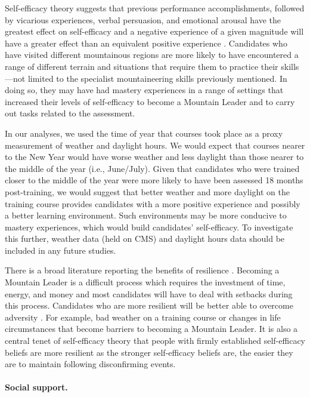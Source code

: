 \documentclass[
  12pt,
  a4paper,
]{book}
\begin{document}
Self-efficacy theory suggests that previous performance accomplishments, followed by vicarious experiences, verbal persuasion, and emotional arousal have the greatest effect on self-efficacy and a negative experience of a given magnitude will have a greater effect than an equivalent positive experience \citep{Bandura1977, Bandura1982}. Candidates who have visited different mountainous regions are more likely to have encountered a range of different terrain and situations that require them to practice their skills---not limited to the specialist mountaineering skills previously mentioned. In doing so, they may have had mastery experiences in a range of settings that increased their levels of self-efficacy to become a Mountain Leader and to carry out tasks related to the assessment.

In our analyses, we used the time of year that courses took place as a proxy measurement of weather and daylight hours. We would expect that courses nearer to the New Year would have worse weather and less daylight than those nearer to the middle of the year (i.e., June/July). Given that candidates who were trained closer to the middle of the year were more likely to have been assessed 18 months post-training, we would suggest that better weather and more daylight on the training course provides candidates with a more positive experience and possibly a better learning environment. Such environments may be more conducive to mastery experiences, which would build candidates' self-efficacy. To investigate this further, weather data (held on CMS) and daylight hours data should be included in any future studies.

There is a broad literature reporting the benefits of resilience \citep[e.g.,][]{Seery2016, Smith2008}. Becoming a Mountain Leader is a difficult process which requires the investment of time, energy, and money and most candidates will have to deal with setbacks during this process. Candidates who are more resilient will be better able to overcome adversity \citep{Smith2008}. For example, bad weather on a training course or changes in life circumstances that become barriers to becoming a Mountain Leader. It is also a central tenet of self-efficacy theory that people with firmly established self-efficacy beliefs are more resilient \citep{Bandura1997} as the stronger self-efficacy beliefs are, the easier they are to maintain following disconfirming events.

\hypertarget{pra-male-gta-social-support}{%
\paragraph{Social support.}\label{pra-male-gta-social-support}}
\end{document}
